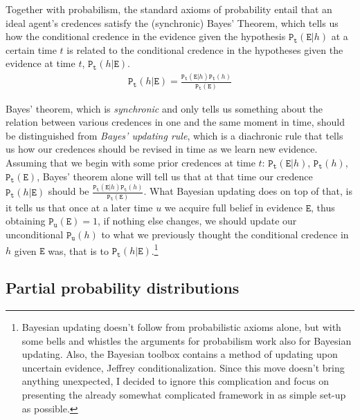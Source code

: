 \documentclass[10pt,leqno]{article}
\newcommand{\prt}[1]{\mbox{$\mathtt{P_t}(#1)$}}
\newcommand{\pru}[1]{\mbox{$\mathtt{P_u}(#1)$}}
\begin{document}
Together with probabilism, the standard axioms of probability entail that an ideal agent's credences satisfy the (synchronic) Bayes' Theorem, which tells us how the conditional credence in the evidence given the hypothesis $\prt{\mathtt{E}\vert h}$  at a certain time $t$ is related to the conditional credence in the hypotheses given the evidence at time  $t$,   $\prt{h\vert \mathtt{E}}$.
 \begin{align}\tag{Bayes}\label{Bayes}\prt{h\vert \mathtt{E}} =\frac{\prt{\mathtt{E}\vert h}\prt{h}}
 {\prt{\mathtt{E}}}\end{align}


Bayes' theorem, which is \emph{synchronic} and only tells us something about the relation between various credences in one and the same moment in time, should be distinguished from \emph{Bayes' updating rule}, which is a diachronic rule that tells us how our credences should be revised in time as we learn new evidence. Assuming that we begin with some prior credences at time $t$: $\prt{\mathtt{E}\vert h}$, $\prt{h}$, $\prt{\mathtt{E}}$,   Bayes' theorem alone will tell us that at that time our credence $\prt{h\vert \mathtt{E}}$ should be $\frac{\prt{\mathtt{E}\vert h}\prt{h}}{\prt{\mathtt{E}}}$. What Bayesian updating does on top of that, is  it tells us that once at a later time $u$ we acquire full belief in evidence $\mathtt{E}$, thus obtaining $\pru{\mathtt{E}}=1$, if nothing else changes, we should update our unconditional $\pru{h}$ to what we previously thought the conditional credence in $h$ given $\mathtt{E}$ was, that is to $\prt{h\vert \mathtt{E}}$.\footnote{ Bayesian updating doesn't follow from probabilistic axioms alone, but with some bells and whistles the arguments for probabilism work also for Bayesian updating. Also, the Bayesian toolbox contains a method of updating upon uncertain evidence, Jeffrey conditionalization. Since this move doesn't bring anything unexpected, I  decided to ignore this complication and focus on presenting the already somewhat complicated framework in as simple set-up as possible.}








\subsection{Partial probability distributions}\label{subsec:partial_probability}
\end{document}
